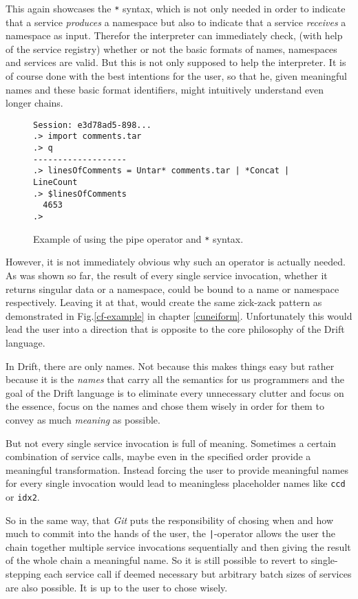 This again showcases the \texttt{*} syntax, which is not only
needed in order to indicate that a service \textit{produces}
a namespace but also to indicate that a service \textit{receives}
 a namespace as input. Therefor the interpreter can immediately check,
(with help of the service registry)
whether or not the basic formats of names, namespaces and services
are valid. But this is not only supposed to help the interpreter.
It is of course done with the best intentions for the user, so that he,
given meaningful names and these basic format identifiers, might
intuitively understand even longer chains.

\begin{figure}[h]
    \begin{lstlisting}
Session: e3d78ad5-898...
.> import comments.tar
.> q
-------------------
.> linesOfComments = Untar* comments.tar | *Concat | LineCount
.> $linesOfComments
  4653
.>
    \end{lstlisting}
  \caption{Example of using the pipe operator and \texttt{*} syntax.}
  \label{pipe-example}
\end{figure}

However, it is not
immediately obvious why such an operator is actually needed.
As was shown so far, the result of every single service invocation,
whether it returns singular data or a namespace, could be bound to
a name or namespace respectively. Leaving it at that, would create
the same zick-zack pattern as demonstrated in Fig.\ref{cf-example}
in chapter \ref{cuneiform}. Unfortunately this would lead the user
into a direction that is opposite to the core philosophy of the
Drift language.

In Drift, there are only names. Not because this makes things
easy but rather because it is the \textit{names} that carry all
the semantics for us programmers and the goal of the Drift language
is to eliminate every unnecessary clutter and focus on the essence,
focus on the names and chose them wisely in order for them to
convey as much \textit{meaning} as possible.

But not every single service invocation is full of meaning. Sometimes
a certain combination of service calls, maybe even in the specified
order provide a meaningful transformation. Instead forcing the user
to provide meaningful names for every single invocation would lead
to meaningless placeholder names like \texttt{ccd} or \texttt{idx2}.

So in the same way, that \textit{Git} puts the responsibility of
chosing when and how much to commit into the hands of the user,
the \texttt{|}-operator allows the user the chain together
multiple service invocations sequentially and then giving the
result of the whole chain a meaningful name. So it is still
possible to revert to single-stepping each service call if
deemed necessary but arbitrary batch sizes of services are
also possible. It is up to the user to chose wisely.

